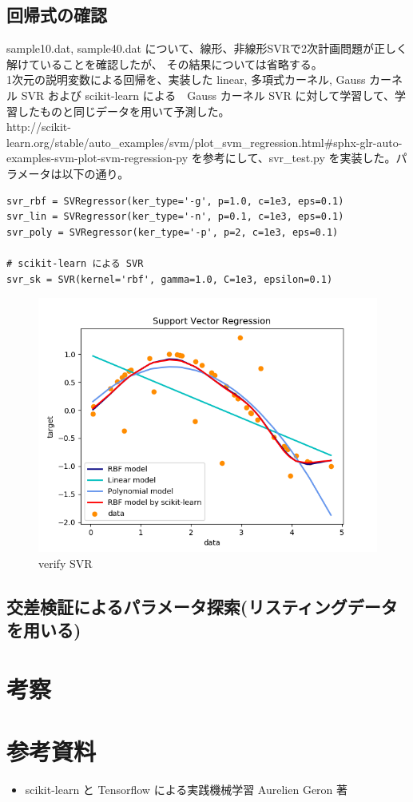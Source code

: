 \documentclass{jsarticle}
\begin{document}
\subsection{回帰式の確認}
sample10.dat, sample40.dat について、線形、非線形SVRで2次計画問題が正しく解けていることを確認したが、
その結果については省略する。 \\
1次元の説明変数による回帰を、実装した linear, 多項式カーネル, Gauss カーネル SVR および scikit-learn による　Gauss カーネル SVR
に対して学習して、学習したものと同じデータを用いて予測した。 \\
http://scikit-learn.org/stable/auto\_examples/svm/plot\_svm\_regression.html\#sphx-glr-auto-examples-svm-plot-svm-regression-py
を参考にして、svr\_test.py を実装した。パラメータは以下の通り。
\begin{lstlisting}
svr_rbf = SVRegressor(ker_type='-g', p=1.0, c=1e3, eps=0.1)
svr_lin = SVRegressor(ker_type='-n', p=0.1, c=1e3, eps=0.1)
svr_poly = SVRegressor(ker_type='-p', p=2, c=1e3, eps=0.1)

# scikit-learn による SVR
svr_sk = SVR(kernel='rbf', gamma=1.0, C=1e3, epsilon=0.1)
\end{lstlisting}
\begin{figure}[!h]
\centering \includegraphics[width=15cm]{svr_verify.png}
\caption{verify SVR}
\end{figure}

\subsection{交差検証によるパラメータ探索(リスティングデータを用いる)}

\section{考察}



\section{参考資料}
\begin{itemize}
    \item scikit-learn と Tensorflow による実践機械学習 Aurelien Geron 著
\end{itemize}
\end{document}

